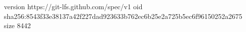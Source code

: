 version https://git-lfs.github.com/spec/v1
oid sha256:8543f33e38137a42f227dad923633b762ec6b25e2a725b5ec6f96150252a2675
size 8442
